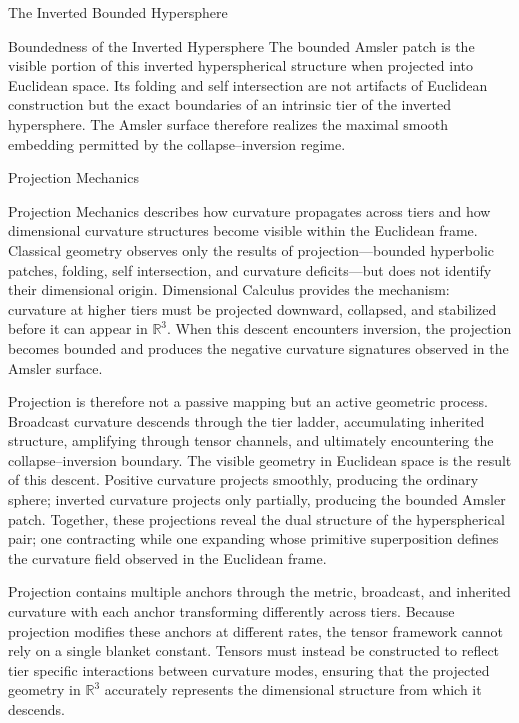 \documentclass[final,onefignum,onetabnum]{siamart}
\begin{document}
\begin{section}{The Inverted Bounded Hypersphere}
\begin{subsection}{Boundedness of the Inverted Hypersphere}
The bounded Amsler patch is the visible portion of this inverted hyperspherical structure when projected into Euclidean space. Its folding and self intersection are not artifacts of Euclidean construction but the exact boundaries of an intrinsic tier of the inverted hypersphere. The Amsler surface therefore realizes the maximal smooth embedding permitted by the collapse–inversion regime.
\end{subsection}
\end{section}

\begin{section}{Projection Mechanics}

Projection Mechanics describes how curvature propagates across tiers and how dimensional curvature structures become visible within the Euclidean frame. Classical geometry observes only the results of projection—bounded hyperbolic patches, folding, self intersection, and curvature deficits—but does not identify their dimensional origin. Dimensional Calculus provides the mechanism: curvature at higher tiers must be projected downward, collapsed, and stabilized before it can appear in $\mathbb{R}^3.$ When this descent encounters inversion, the projection becomes bounded and produces the negative curvature signatures observed in the Amsler surface.

Projection is therefore not a passive mapping but an active geometric process. Broadcast curvature descends through the tier ladder, accumulating inherited structure, amplifying through tensor channels, and ultimately encountering the collapse–inversion boundary. The visible geometry in Euclidean space is the result of this descent. Positive curvature projects smoothly, producing the ordinary sphere; inverted curvature projects only partially, producing the bounded Amsler patch. Together, these projections reveal the dual structure of the hyperspherical pair; one contracting while one expanding whose primitive superposition defines the curvature field observed in the Euclidean frame.

Projection contains multiple anchors through the metric, broadcast, and inherited curvature with each anchor transforming differently across tiers. Because projection modifies these anchors at different rates, the tensor framework cannot rely on a single blanket constant. Tensors must instead be constructed to reflect tier specific interactions between curvature modes, ensuring that the projected geometry in $\mathbb{R}^3$ accurately represents the dimensional structure from which it descends.


\end{section}
\end{document}
